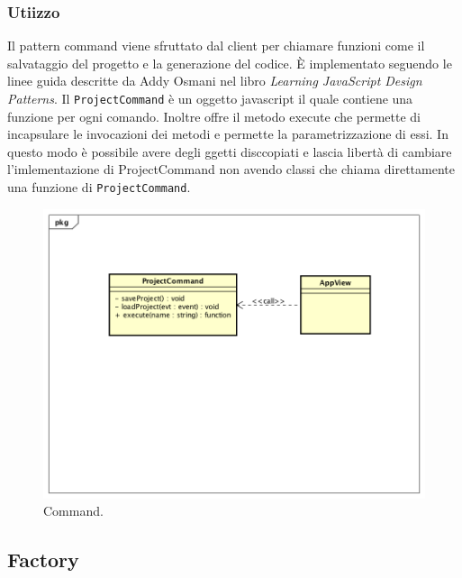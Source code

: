 \subsubsection{Utiizzo}
Il pattern command viene sfruttato dal client per chiamare funzioni come il salvataggio del progetto e la generazione del codice. È implementato seguendo le linee guida descritte da Addy Osmani nel libro \emph{Learning JavaScript Design Patterns}. Il \texttt{ProjectCommand} è un oggetto javascript il quale contiene una funzione per ogni comando. Inoltre offre il metodo execute che permette di incapsulare le invocazioni dei metodi e permette la parametrizzazione di essi. In questo modo è possibile avere degli ggetti disccopiati e lascia libertà di cambiare l'imlementazione di ProjectCommand non avendo classi che chiama direttamente una funzione di \texttt{ProjectCommand}.
\begin{figure}[H] \label{fig:command}
	\includegraphics[scale=0.6]{img/commandExample.png}
	\caption{Command.}
\end{figure}

\subsection{Factory}


